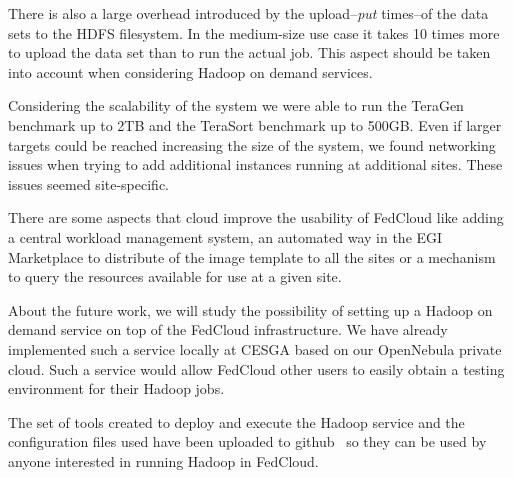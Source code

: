 

There is also a large overhead introduced by the upload--\emph{put} times--of the data sets to the HDFS filesystem. In the medium-size use case it takes 10 times more to upload the data set than to run the actual job. This aspect should be taken into account when considering Hadoop on demand services.

Considering the scalability of the system we were able to run the TeraGen benchmark up to 2TB and the TeraSort benchmark up to 500GB. Even if larger targets could be reached increasing the size of the system, we found networking issues when trying to add additional instances running at additional sites. These issues seemed site-specific.

There are some aspects that cloud improve the usability of FedCloud like adding a central workload management system, an automated way in the EGI Marketplace to distribute of the image template to all the sites or a mechanism to query the resources available for use at a given site.


About the future work, we will study the possibility of setting up a Hadoop on demand service on top of the FedCloud infrastructure. We have already implemented such a service locally at CESGA based on our OpenNebula private cloud. Such a service would allow FedCloud other users to easily obtain a testing environment for their Hadoop jobs.

The set of tools created to deploy and execute the Hadoop service and the configuration files used have been uploaded to github~\cite{scripts}\cite{hadoopondemand} so they can be used by anyone interested in running Hadoop in FedCloud. 


